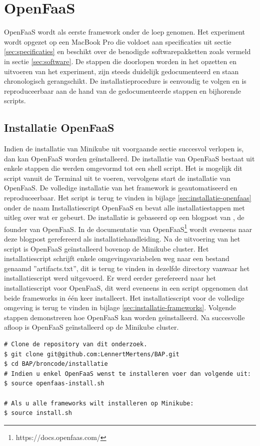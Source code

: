 \newpage
\section{OpenFaaS}
OpenFaaS wordt als eerste framework onder de loep genomen. Het experiment wordt opgezet op een MacBook Pro die voldoet aan specificaties uit sectie \ref{sec:specificaties} en beschikt over de benodigde softwarepakketten zoals vermeld in sectie \ref{sec:software}. De stappen die doorlopen worden in het opzetten en uitvoeren van het experiment, zijn steeds duidelijk gedocumenteerd en staan chronologisch gerangschikt. De installatieprocedure is eenvoudig te volgen en is reproduceerbaar aan de hand van de gedocumenteerde stappen en bijhorende scripts.

\subsection{Installatie OpenFaaS}
Indien de installatie van Minikube uit voorgaande sectie succesvol verlopen is, dan kan OpenFaaS worden geïnstalleerd. De installatie van OpenFaaS bestaat uit enkele stappen die werden omgevormd tot een shell script. Het is mogelijk dit script vanuit de Terminal uit te voeren, vervolgens start de installatie van OpenFaaS. De volledige installatie van het framework is geautomatiseerd en reproduceerbaar. Het script is terug te vinden in bijlage \ref{sec:installatie-openfaas} onder de naam Installatiescript OpenFaaS en bevat alle installatiestappen met uitleg over wat er gebeurt. De installatie is gebaseerd op een blogpost van \textcite{Ellis2017}, de founder van OpenFaaS. In de documentatie van OpenFaaS\footnote{https://docs.openfaas.com/} wordt eveneens naar deze blogpost gerefereerd als installatiehandleiding. Na de  uitvoering van het script is OpenFaaS geïnstalleerd bovenop de Minikube cluster. Het installatiescript schrijft enkele omgevingsvariabelen weg naar een bestand genaamd ''artifacts.txt'', dit is terug te vinden in dezelfde directory vanwaar het installatiescript werd uitgevoerd. Er werd eerder gerefereerd naar het installatiescript voor OpenFaaS, dit werd eveneens in een script opgenomen dat beide frameworks in één keer installeert. Het installatiescript voor de volledige omgeving is terug te vinden in bijlage \ref{sec:installatie-frameworks}. Volgende stappen demonstreren hoe OpenFaaS kan worden geïnstalleerd. Na succesvolle afloop is OpenFaaS geïnstalleerd op de Minikube cluster.

\begin{lstlisting}
# Clone de repository van dit onderzoek.
$ git clone git@github.com:LennertMertens/BAP.git
$ cd BAP/broncode/installatie
# Indien u enkel OpenFaaS wenst te installeren voer dan volgende uit:
$ source openfaas-install.sh

# Als u alle frameworks wilt installeren op Minikube:
$ source install.sh
\end{lstlisting}

